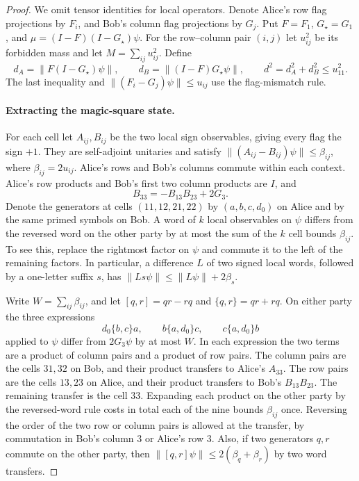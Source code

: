 \begin{proof}
We omit tensor identities for local operators. Denote Alice's row flag
projections by $F_i$, and Bob's column flag projections by $G_j$. Put
$F=F_1$, $G_\star=G_1$, and $\mu=(I-F)(I-G_\star)\psi$. For the row--column
pair $(i,j)$ let $u_{ij}^2$ be its forbidden mass and let
$M=\sum_{ij}u_{ij}^2$. Define
\[
 d_A=\|F(I-G_\star)\psi\|,\qquad
 d_B=\|(I-F)G_\star\psi\|,\qquad d^2=d_A^2+d_B^2\le u_{11}^2.
\]
The last inequality and $\|(F_i-G_j)\psi\|\le u_{ij}$ use the flag-mismatch
rule.

\paragraph{Extracting the magic-square state.}
For each cell let $A_{ij},B_{ij}$ be the two local sign observables, giving
every flag the sign $+1$. They are self-adjoint unitaries and satisfy
$\|(A_{ij}-B_{ij})\psi\|\le\beta_{ij}$, where $\beta_{ij}=2u_{ij}$.
Alice's rows and Bob's columns commute within each context. Alice's row
products and Bob's first two column products are $I$, and
\[
 B_{33}=-B_{13}B_{23}+2G_3.
\]
Denote the generators at cells $(11,12,21,22)$ by $(a,b,c,d_0)$ on Alice
and by the same primed symbols on Bob. A word of $k$ local observables on
$\psi$ differs from the reversed word on the other party by at most the
sum of the $k$ cell bounds $\beta_{ij}$. To see this, replace the
rightmost factor on $\psi$ and commute it to the left of the remaining
factors. In particular, a difference $L$ of two signed local words,
followed by a one-letter suffix $s$, has
$\|Ls\psi\|\le\|L\psi\|+2\beta_s$.

Write $W=\sum_{ij}\beta_{ij}$, and let $[q,r]=qr-rq$ and
$\{q,r\}=qr+rq$. On either party the three expressions
\[
 d_0\{b,c\}a,\qquad b\{a,d_0\}c,\qquad c\{a,d_0\}b
\]
applied to $\psi$ differ from $2G_3\psi$ by at most $W$.
In each expression the two terms are a product of column pairs and a
product of row pairs. The column pairs are the cells $31,32$ on Bob,
and their product transfers to Alice's $A_{33}$. The row pairs are the
cells $13,23$ on Alice, and their product transfers to Bob's
$B_{13}B_{23}$. The remaining transfer is the cell $33$.
Expanding each product on the other party by the reversed-word rule
costs in total each of the nine bounds $\beta_{ij}$ once. Reversing the
order of the two row or column pairs is allowed at the transfer, by
commutation in Bob's column 3 or Alice's row 3. Also, if two generators
$q,r$ commute on the other party, then
$\|[q,r]\psi\|\le2(\beta_q+\beta_r)$ by two word transfers.


\end{proof}
